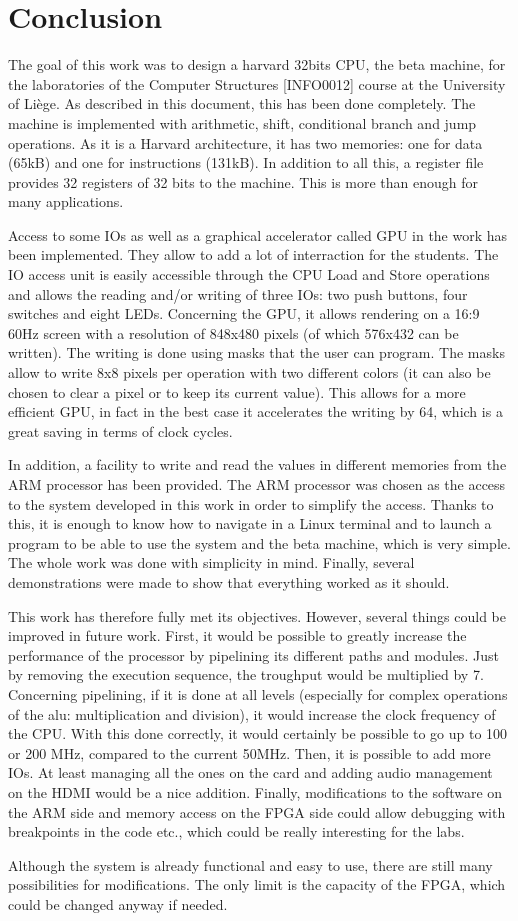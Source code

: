 \chapter{Conclusion}

The goal of this work was to design a harvard 32bits CPU, the beta machine, for the laboratories of the Computer 
Structures [INFO0012] 
course at the University of Liège. As described in this document, this has been done completely. 
The machine is implemented with arithmetic, shift, conditional branch and jump operations. As 
it is a Harvard architecture, it has two memories: one for data (65kB) and one for instructions (131kB). In addition to 
all this, a register file provides 32 registers of 32 bits to the machine. This is more than enough for many applications.

Access to some IOs as well as a graphical accelerator called GPU in the work has been
implemented. They allow to add a lot of interraction for the students. 
The IO access unit is easily accessible through the CPU Load and Store operations and allows the 
reading and/or writing of three IOs: two push buttons, four switches and eight LEDs. Concerning the 
GPU, it allows rendering on a 16:9 60Hz screen with a resolution of 848x480 pixels (of which 
576x432 can be written). The writing is done using masks that the user can program. The masks 
allow to write 8x8 pixels per operation with two different colors (it can also be chosen to clear 
a pixel or to keep its current value). This allows for a more efficient GPU, in fact in the best 
case it accelerates the writing by 64, which is a great saving in terms of clock cycles.

In addition, a facility to write and 
read the values in different memories from the ARM processor has been provided. 
The ARM processor was chosen as the access to the system developed in this work in order to simplify 
the access.  Thanks to this, it is enough to know how to navigate in a Linux terminal and to launch a program 
to be able to use the system and the beta machine, which is very simple. The whole work was done with simplicity 
in mind.  Finally, several demonstrations were 
made to show that everything worked as it should.

This work has therefore fully met its objectives. However, several things could be improved in future 
work. First, it would be possible to greatly increase the performance of the processor by pipelining 
its different paths and modules. Just by removing the execution sequence, the troughput would be 
multiplied by 7. Concerning pipelining, if it is done at all levels (especially for complex operations 
of the alu: multiplication and division), it would increase the clock frequency of the CPU. With 
this done correctly, it would certainly be possible to go up to 100 or 200 MHz, compared to the current 50MHz. Then, it 
is possible to add more IOs. At least managing all the ones on the card and adding audio management 
on the HDMI would be a nice addition. Finally, modifications to the software on the ARM side and 
memory access on the FPGA side could allow debugging with breakpoints in the code etc., which could 
be really interesting for the labs. 

Although the system is already functional and easy to use, there are still many possibilities for 
modifications. The only limit is the capacity of the FPGA, which could be changed anyway if needed.
